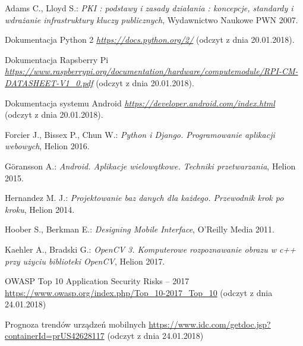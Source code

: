\newpage
   \begin{thebibliography}{99}
    	Adams C., Lloyd S.: 
    	\textit{PKI : podstawy i zasady działania : koncepcje, standardy i wdrażanie infrastruktury kluczy publicznych}, Wydawnictwo Naukowe PWN 2007.
    	
    	Dokumentacja Python 2
    	\textit{ \href  {https://docs.python.org/2/}{https://docs.python.org/2/} }(odczyt z dnia 20.01.2018).
    	
    	Dokumentacja Rapsberry Pi \\
    	\textit{ \href {https://www.raspberrypi.org/documentation/hardware/computemodule/RPI-CM-DATASHEET-V1_0.pdf} {https://www.raspberrypi.org/documentation/hardware/computemodule/RPI-CM-DATASHEET-V1\_0.pdf} }(odczyt z dnia 20.01.2018).
    	 
    	Dokumentacja systemu Android
    	\textit{ \href {https://developer.android.com/index.html} {https://developer.android.com/index.html} }(odczyt z dnia 20.01.2018).
    	 
    	Forcier J., Bissex P., Chun W.:
    	\textit{Python i Django. Programowanie aplikacji webowych}, 
    	Helion 2016.
    	
    	Göransson A.: 
    	\textit{Android. Aplikacje wielowątkowe. Techniki przetwarzania}, 
    	Helion 2015. 
    	
    	Hernandez M. J.: 
    	\textit{Projektowanie baz danych dla każdego. Przewodnik krok po kroku}, 
    	Helion 2014.
    	
    	Hoober S., Berkman E.: 
    	\textit{Designing Mobile Interface}, 
    	 O'Reilly Media 2011.
    	 
    	 Kaehler A., Bradski G.: 
    	 \textit{OpenCV 3. Komputerowe rozpoznawanie obrazu w c++ przy użyciu biblioteki OpenCV}, Helion 2017.
    	 
    	 OWASP Top 10 Application Security Risks -- 2017\\
    	 \href{https://www.owasp.org/index.php/Top_10-2017_Top_10}{https://www.owasp.org/index.php/Top\_10-2017\_Top\_10} (odczyt z dnia 24.01.2018)
    	 
    	 Prognoza trendów urządzeń mobilnych
    	 \href{https://www.idc.com/getdoc.jsp?containerId=prUS42628117}{https://www.idc.com/getdoc.jsp?containerId=prUS42628117} (odczyt z dnia 24.01.2018)
    	 

\end{thebibliography}
